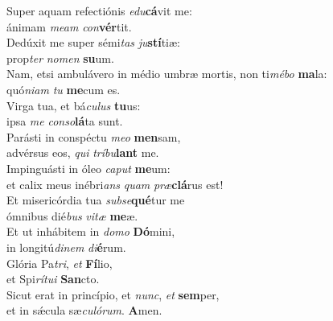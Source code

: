 \evenverse Super aquam refectiónis \textit{e}\textit{du}\textbf{cá}vit me:~\*\\
\evenverse ánimam \textit{me}\textit{am} \textit{con}\textbf{vér}tit.\\
\oddverse Dedúxit me super sémi\textit{tas} \textit{ju}\textbf{stí}tiæ:~\*\\
\oddverse prop\textit{ter} \textit{no}\textit{men} \textbf{su}um.\\
\evenverse Nam, etsi ambulávero in médio umbræ mortis, non ti\textit{mé}\textit{bo} \textbf{ma}la:~\*\\
\evenverse quó\textit{ni}\textit{am} \textit{tu} \textbf{me}cum es.\\
\oddverse Virga tua, et bá\textit{cu}\textit{lus} \textbf{tu}us:~\*\\
\oddverse ipsa \textit{me} \textit{con}\textit{so}\textbf{lá}ta sunt.\\
\evenverse Parásti in conspéctu \textit{me}\textit{o} \textbf{men}sam,~\*\\
\evenverse advérsus eos, \textit{qui} \textit{trí}\textit{bu}\textbf{lant} me.\\
\oddverse Impinguásti in óleo \textit{ca}\textit{put} \textbf{me}um:~\*\\
\oddverse et calix meus inébri\textit{ans} \textit{quam} \textit{præ}\textbf{clá}rus est!\\
\evenverse Et misericórdia tua \textit{sub}\textit{se}\textbf{qué}tur me~\*\\
\evenverse ómnibus dié\textit{bus} \textit{vi}\textit{tæ} \textbf{me}æ.\\
\oddverse Et ut inhábitem in \textit{do}\textit{mo} \textbf{Dó}mini,~\*\\
\oddverse in longitú\textit{di}\textit{nem} \textit{di}\textbf{é}rum.\\
\evenverse Glória Pa\textit{tri}, \textit{et} \textbf{Fí}lio,~\*\\
\evenverse et Spi\textit{rí}\textit{tu}\textit{i} \textbf{San}cto.\\
\oddverse Sicut erat in princípio, et \textit{nunc}, \textit{et} \textbf{sem}per,~\*\\
\oddverse et in sǽcula sæ\textit{cu}\textit{ló}\textit{rum}. \textbf{A}men.\\
